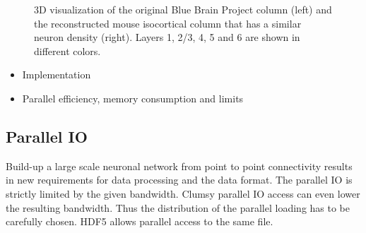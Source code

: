 \documentclass[a4paper]{article}
\begin{document}
\begin{figure}[ht!]
   	\begin{center}
        \hspace{1cm}
    	   \end{center}
    	\caption{%
        3D visualization of the original Blue Brain Project column (left) and the reconstructed mouse
isocortical column that has a similar neuron density (right). Layers 1, 2/3, 4, 5 and 6 are
shown in different colors.
     }%
   \label{fig:atlas}
   \end{figure}

\begin{itemize}
      \item Implementation
      \item Parallel efficiency, memory consumption and limits
   \end{itemize}

\subsection{Parallel IO}
Build-up a large scale neuronal network from point to point connectivity results in new requirements for data processing and the data format. The parallel IO is strictly limited by the given bandwidth. Clumsy parallel IO access can even lower the resulting bandwidth.
Thus the distribution of the parallel loading has to be carefully chosen. HDF5 allows parallel access to the same file.
\end{document}
